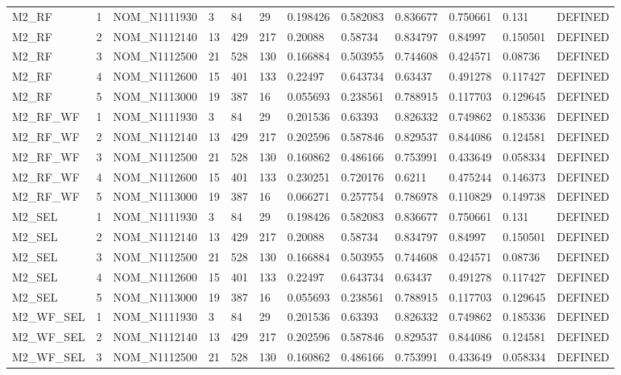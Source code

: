 \begin{table}[ht]
\begin{tabular}{llllllllllll}
M2\_RF & 1 & NOM\_N1111930 & 3 & 84 & 29 & 0.198426 & 0.582083 & 0.836677 & 0.750661 & 0.131 & DEFINED \\
M2\_RF & 2 & NOM\_N1112140 & 13 & 429 & 217 & 0.20088 & 0.58734 & 0.834797 & 0.84997 & 0.150501 & DEFINED \\
M2\_RF & 3 & NOM\_N1112500 & 21 & 528 & 130 & 0.166884 & 0.503955 & 0.744608 & 0.424571 & 0.08736 & DEFINED \\
M2\_RF & 4 & NOM\_N1112600 & 15 & 401 & 133 & 0.22497 & 0.643734 & 0.63437 & 0.491278 & 0.117427 & DEFINED \\
M2\_RF & 5 & NOM\_N1113000 & 19 & 387 & 16 & 0.055693 & 0.238561 & 0.788915 & 0.117703 & 0.129645 & DEFINED \\
M2\_RF\_WF & 1 & NOM\_N1111930 & 3 & 84 & 29 & 0.201536 & 0.63393 & 0.826332 & 0.749862 & 0.185336 & DEFINED \\
M2\_RF\_WF & 2 & NOM\_N1112140 & 13 & 429 & 217 & 0.202596 & 0.587846 & 0.829537 & 0.844086 & 0.124581 & DEFINED \\
M2\_RF\_WF & 3 & NOM\_N1112500 & 21 & 528 & 130 & 0.160862 & 0.486166 & 0.753991 & 0.433649 & 0.058334 & DEFINED \\
M2\_RF\_WF & 4 & NOM\_N1112600 & 15 & 401 & 133 & 0.230251 & 0.720176 & 0.6211 & 0.475244 & 0.146373 & DEFINED \\
M2\_RF\_WF & 5 & NOM\_N1113000 & 19 & 387 & 16 & 0.066271 & 0.257754 & 0.786978 & 0.110829 & 0.149738 & DEFINED \\
M2\_SEL & 1 & NOM\_N1111930 & 3 & 84 & 29 & 0.198426 & 0.582083 & 0.836677 & 0.750661 & 0.131 & DEFINED \\
M2\_SEL & 2 & NOM\_N1112140 & 13 & 429 & 217 & 0.20088 & 0.58734 & 0.834797 & 0.84997 & 0.150501 & DEFINED \\
M2\_SEL & 3 & NOM\_N1112500 & 21 & 528 & 130 & 0.166884 & 0.503955 & 0.744608 & 0.424571 & 0.08736 & DEFINED \\
M2\_SEL & 4 & NOM\_N1112600 & 15 & 401 & 133 & 0.22497 & 0.643734 & 0.63437 & 0.491278 & 0.117427 & DEFINED \\
M2\_SEL & 5 & NOM\_N1113000 & 19 & 387 & 16 & 0.055693 & 0.238561 & 0.788915 & 0.117703 & 0.129645 & DEFINED \\
M2\_WF\_SEL & 1 & NOM\_N1111930 & 3 & 84 & 29 & 0.201536 & 0.63393 & 0.826332 & 0.749862 & 0.185336 & DEFINED \\
M2\_WF\_SEL & 2 & NOM\_N1112140 & 13 & 429 & 217 & 0.202596 & 0.587846 & 0.829537 & 0.844086 & 0.124581 & DEFINED \\
M2\_WF\_SEL & 3 & NOM\_N1112500 & 21 & 528 & 130 & 0.160862 & 0.486166 & 0.753991 & 0.433649 & 0.058334 & DEFINED \\

\end{tabular}
\end{table}

